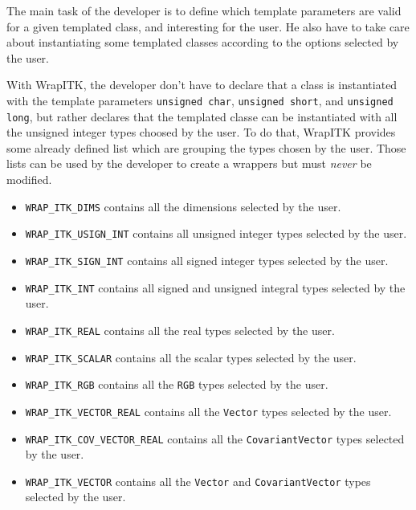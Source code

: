 \documentclass{InsightArticle}
\begin{document}
The main task of the developer is to define which template parameters are valid for a given
templated class, and interesting for the user. He also have to take care about
instantiating some templated classes according to the options selected by the user.

With WrapITK, the developer don't have to declare that a class is instantiated with the template parameters
\verb$unsigned char$, \verb$unsigned short$, and \verb$unsigned long$, but rather declares that the
templated classe can be instantiated with all the unsigned integer types choosed by the user.
To do that, WrapITK provides some already defined list which are grouping the types chosen by
the user. Those lists can be used by the developer to create a wrappers but must
{\em never} be modified.

\begin{itemize}
  \item \verb$WRAP_ITK_DIMS$ contains all the dimensions selected by the user.

  \item \verb$WRAP_ITK_USIGN_INT$ contains all unsigned integer types selected by the user.

  \item \verb$WRAP_ITK_SIGN_INT$ contains all signed integer types selected by the user.

  \item \verb$WRAP_ITK_INT$ contains all signed and unsigned integral types
selected by the user.

  \item \verb$WRAP_ITK_REAL$ contains all the real types selected by the user.

  \item \verb$WRAP_ITK_SCALAR$ contains all the scalar types selected by the user.

  \item \verb$WRAP_ITK_RGB$ contains all the \verb$RGB$ types selected by the user.

  \item \verb$WRAP_ITK_VECTOR_REAL$ contains all the \verb$Vector$ types selected
by the user.

  \item \verb$WRAP_ITK_COV_VECTOR_REAL$ contains all the \verb$CovariantVector$ types selected
by the user.

  \item \verb$WRAP_ITK_VECTOR$ contains all the \verb$Vector$ and 
\verb$CovariantVector$ types selected by the user.


\end{itemize}
\end{document}
